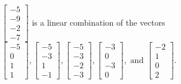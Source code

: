 \begin{exercise}
\begin{exerciseStatement}
  \end{exerciseStatement}
  \begin{exerciseAnswer}
   \(\left[\begin{array}{c}
-5 \\
-9 \\
-2 \\
-7
\end{array}\right]\) 
  	 is  
	a linear combination of the vectors \(\left[\begin{array}{c}
-5 \\
0 \\
1 \\
1
\end{array}\right] , \left[\begin{array}{c}
-5 \\
-3 \\
1 \\
-1
\end{array}\right] , \left[\begin{array}{c}
-5 \\
-3 \\
-2 \\
-3
\end{array}\right] , \left[\begin{array}{c}
-3 \\
0 \\
-3 \\
0
\end{array}\right] , \text{ and } \left[\begin{array}{c}
-2 \\
1 \\
0 \\
2
\end{array}\right]\).

	
  


  \end{exerciseAnswer}
\end{exercise}